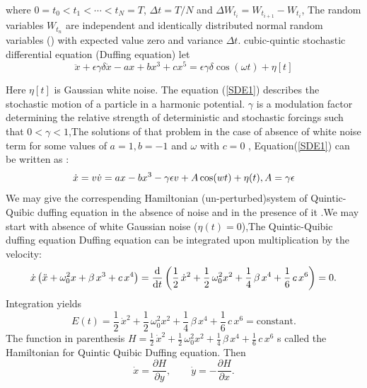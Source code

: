 \documentclass{ws-ijbc}
\begin{document}
where $0 = t_0 <t_1< \cdots <t_N = T$, $\Delta t = T/N$ and $\Delta W_{t_i} = W_{t_{i+1}}- W_{t_i}$, The random variables $W_{t_n}$ are independent and identically distributed normal random variables (\cite{Rafik2018}) with expected value zero and variance $\Delta t$.
 cubic-quintic  stochastic differential equation (Duffing equation)
let 
\begin{equation}\label{SDE1}
\ddot{x} + \epsilon\gamma\delta \dot{x}-ax+bx^3+cx^5=\epsilon\gamma\delta \cos(\omega t) +\eta[t]
\end{equation}

Here $\eta[t]$ is Gaussian white noise. The equation (\ref{SDE1}) describes the stochastic motion of a particle in a harmonic potential. $\gamma$ is a modulation factor determining the relative strength of deterministic and stochastic forcings such that $0<\gamma<1$,The solutions of that problem in the case of absence of white noise term for some values of $a=1,b=-1$ and $\omega$ with $c=0$ , Equation(\ref{SDE1}) can be written as :
\begin{equation}\label{SDE2}
\dot{x}=v\\
\dot{v}=ax-bx^3-\gamma \epsilon v+A\cos(wt)+\eta(t),A=\gamma \epsilon
\end{equation}
We may give the correspending Hamiltonian (un-perturbed)system of Quintic-Quibic duffing equation in the absence of noise and in the presence of it .We may start with absence of white Gaussian noise ($\eta(t)=0$),The Quintic-Quibic duffing equation  Duffing equation can be integrated upon multiplication by the velocity:
\begin{equation}\label{Hamilton1}
    \dot{x} \left( \ddot{x} + \omega_0^2 x + \beta\,x^3 + c\,x^4 \right) = 
\frac{\text d}{{\text d}t} \left( \frac{1}{2}\, \dot{x}^2 + 
\frac{1}{2}\,\omega_0^2 x^2 + \frac{1}{4}\, \beta\,x^4+ \frac{1}{6}\, c\,x^6 \right) = 0.
\end{equation}
Integration yields
\begin{equation}\label{Hamiltonian2}
    E(t) = \frac{1}{2}\, \dot{x}^2 + \frac{1}{2}\,\omega_0^2 x^2 + 
\frac{1}{4}\, \beta\,x^4+\frac{1}{6}\, c\,x^6  = \mbox{constant} .
\end{equation}
The function in parenthesis $H= \frac{1}{2}\, \dot{x}^2 + 
\frac{1}{2}\,\omega_0^2 x^2 + \frac{1}{4}\, \beta\,x^4+\frac{1}{6}\, c\,x^6$ s called the Hamiltonian for Quintic  Quibic  Duffing equation. Then
\begin{equation*}
    \dot{x} = \frac{\partial H}{\partial y} , \qquad \dot{y} = - 
\frac{\partial H}{\partial x} .
\end{equation*}
\end{document}
